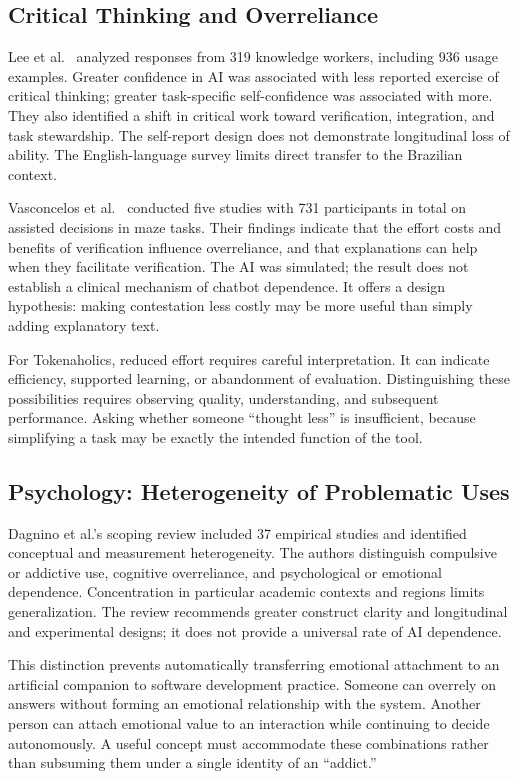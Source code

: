 \documentclass[11pt,a4paper]{article}
\begin{document}
\subsection{Critical Thinking and Overreliance}
Lee et al.\ \cite{lee} analyzed responses from 319 knowledge workers, including 936 usage examples. Greater confidence in AI was associated with less reported exercise of critical thinking; greater task-specific self-confidence was associated with more. They also identified a shift in critical work toward verification, integration, and task stewardship. The self-report design does not demonstrate longitudinal loss of ability. The English-language survey limits direct transfer to the Brazilian context.

Vasconcelos et al.\ \cite{vasconcelos} conducted five studies with 731 participants in total on assisted decisions in maze tasks. Their findings indicate that the effort costs and benefits of verification influence overreliance, and that explanations can help when they facilitate verification. The AI was simulated; the result does not establish a clinical mechanism of chatbot dependence. It offers a design hypothesis: making contestation less costly may be more useful than simply adding explanatory text.

For Tokenaholics, reduced effort requires careful interpretation. It can indicate efficiency, supported learning, or abandonment of evaluation. Distinguishing these possibilities requires observing quality, understanding, and subsequent performance. Asking whether someone ``thought less'' is insufficient, because simplifying a task may be exactly the intended function of the tool.

\subsection{Psychology: Heterogeneity of Problematic Uses}
Dagnino et al.'s scoping review \cite{dagnino} included 37 empirical studies and identified conceptual and measurement heterogeneity. The authors distinguish compulsive or addictive use, cognitive overreliance, and psychological or emotional dependence. Concentration in particular academic contexts and regions limits generalization. The review recommends greater construct clarity and longitudinal and experimental designs; it does not provide a universal rate of AI dependence.

This distinction prevents automatically transferring emotional attachment to an artificial companion to software development practice. Someone can overrely on answers without forming an emotional relationship with the system. Another person can attach emotional value to an interaction while continuing to decide autonomously. A useful concept must accommodate these combinations rather than subsuming them under a single identity of an ``addict.''
\end{document}
